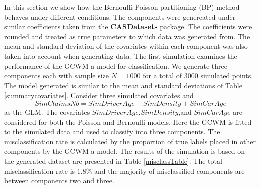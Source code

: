 \documentclass[11pt,letterpaper]{article}
\numberwithin{equation}{section}
\numberwithin{equation}{section}
\numberwithin{equation}{section}
\begin{document}
In this section we show how the Bernoulli-Poisson partitioning (BP) method  behaves under different conditions. The components were genereated under similar coefficients taken from the \textbf{CASDatasets} package. The coefficients were rounded and treated as true parameters to which data was generated from. The mean and standard deviation of the covariates within each component was also taken into account when generating data. The first simulation examines the performance of the GCWM a model for classification. We generate three components each with sample size $N=1000$ for a total of $3000$ simulated points.
The model generated is similar to the mean and standard deviations of Table \ref{summarycovariates}. Consider three simulated covariates and 
\begin{equation}
SimClaimsNb = SimDriverAge + SimDensity + SimCarAge 
\end{equation}
as the GLM. The covariates $SimDriverAge$,$SimDensity$,and $SimCarAge$ are considered for both the Poisson and Bernoulli models. 
 Here the GCWM is fitted to the simulated data and used to classify into three components. The misclassification rate is calculated by the proportion of true labels placed in other components by the GCWM a model.  The results of the simulation is based on the generated dataset are presented in Table \ref{misclassTable}. The total misclassification rate  is $1.8 \% $ and the majority of misclassified components are between components two and three.
\end{document}
